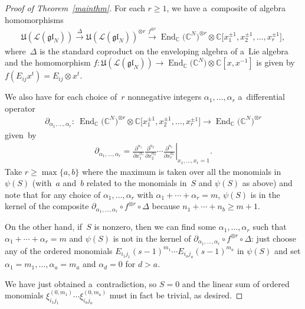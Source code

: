 \documentclass[11pt]{article}
\numberwithin{theorem}{section}
\numberwithin{proposition}{section}
\numberwithin{lemma}{section}
\numberwithin{corollary}{section}
\numberwithin{definition}{section}
\numberwithin{example}{section}
\numberwithin{remark}{section}
\numberwithin{note}{section}
\DeclareMathOperator{\End}{End}
\numberwithin{equation}{section}
\begin{document}
\begin{proof}[Proof of Theorem~\ref{mainthm}]
For each $r \geq 1$, we have a~composite of algebra homomorphisms
\begin{gather*}
\mathfrak{U}(\mathcal{L}(\mathfrak{gl}_N)) \stackrel{\Delta}{\to}
\mathfrak{U}(\mathcal{L}(\mathfrak{gl}_N))^{\otimes r} \stackrel{f^{\otimes r}}{\rightarrow}
\End_{\mathbb{C}}\big(\mathbb{C}^N\big)^{\otimes r} \otimes \mathbb{C}\big[x_1^{\pm 1},x_2^{\pm 1},\ldots,x_r^{\pm 1}\big],
\end{gather*}
where~$\Delta$ is the standard coproduct on the enveloping algebra of a~Lie algebra and the homomorphism $f\colon
\mathfrak{U}(\mathcal{L}(\mathfrak{gl}_N)) \to \End_{\mathbb{C}}\big(\mathbb{C}^N\big) \otimes
\mathbb{C}[x,x^{-1}]$ is given by $f(E_{ij}x^t) = E_{ij} \otimes x^t$.

We also have for each choice of~$r$ nonnegative integers $\alpha_1, \ldots, \alpha_r$ a~dif\/ferential operator
\begin{gather*}
\partial_{\alpha_1,\ldots,\alpha_r}\colon \ \End_{\mathbb{C}}\big(\mathbb{C}^N\big)^{\otimes r} \otimes \mathbb{C}\big[x_1^{\pm
1},x_2^{\pm 1},\ldots,x_r^{\pm 1}\big] \to \End_{\mathbb{C}}\big(\mathbb{C}^N\big)^{\otimes r}
\end{gather*}
given~by
\begin{gather*}
\partial_{\alpha_1, \ldots, \alpha_r}=\left.\frac{\partial^{\alpha_1}}{\partial x_1^{\alpha_1}}
\frac{\partial^{\alpha_2}}{\partial x_2^{\alpha_2}} \cdots \frac{\partial^{\alpha_r}}{\partial x_r^{\alpha_r}}
\right\rvert_{x_1,\ldots,x_r=1}.
\end{gather*}
Take $r \geq \max\{a,b\}$ where the maximum is taken over all the monomials in $\psi(S)$ (with~$a$ and~$b$ related to
the monomials in~$S$ and $\psi(S)$ as above) and note that for any choice of $\alpha_1,\ldots,\alpha_r$ with $\alpha_1+
\cdots + \alpha_r=m$, $\psi(S)$ is in the kernel of the composite $\partial_{\alpha_1,\ldots,\alpha_r} \circ f^{\otimes
r} \circ \Delta$ because $n_1 + \cdots + n_b \geq m+1$.

On the other hand, if~$S$ is nonzero, then we can f\/ind some $\alpha_1,\ldots,\alpha_r$ such that $\alpha_1 + \cdots +
\alpha_r=m$ and $\psi(S)$ is not in the kernel of $\partial_{\alpha_1,\ldots,\alpha_r} \circ f^{\otimes r} \circ
\Delta$: just choose any of the ordered monomials $E_{i_1 j_1}(s-1)^{m_1} \cdots E_{i_a j_a} (s-1)^{m_a}$ in $\psi(S)$
and set $\alpha_1=m_1, \ldots, \alpha_a=m_a$ and $\alpha_d=0$ for $d>a$.

We have just obtained a~contradiction, so $S=0$ and the linear sum of ordered monomials $\xi_{i_1 j_1}^{(0,m_1)} \cdots
\xi_{i_a j_a}^{(0,m_a)}$ must in fact be trivial, as desired.
\end{proof}
\end{document}
